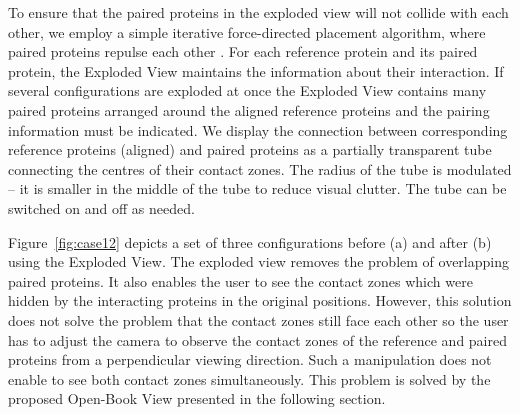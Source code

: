 \documentclass[twocolumn]{bmcart}%
\def\OpBook {Open-Book View\xspace}
\def\ExpView {Exploded View\xspace}
\begin{document}
To ensure that the paired proteins in the exploded view will not collide with each other, we employ a simple iterative force-directed placement algorithm, where paired proteins repulse each other \cite{fruchterman1991graph}.
For each reference protein and its paired protein, the \ExpView maintains the information about their interaction.
If several configurations are exploded at once the \ExpView contains many paired proteins arranged around the aligned reference proteins and the pairing information must be indicated.
We display the connection between corresponding reference proteins (aligned) and paired proteins as a partially transparent tube connecting the centres of their contact zones.
The radius of the tube is modulated -- it is smaller in the middle of the tube to reduce visual clutter.
The tube can be switched on and off as needed.

Figure~\ref{fig:case12} depicts a set of three configurations before (a) and after (b) using the \ExpView.
The exploded view removes the problem of overlapping paired proteins.
It also enables the user to see the contact zones which were hidden by the interacting proteins in the original positions.
However, this solution does not solve the problem that the contact zones still face each other so the user has to adjust the camera to observe the contact zones of the reference and paired proteins from a perpendicular viewing direction. 
Such a manipulation does not enable to see both contact zones simultaneously.
This problem is solved by the proposed \OpBook presented in the following section.
\end{document}
